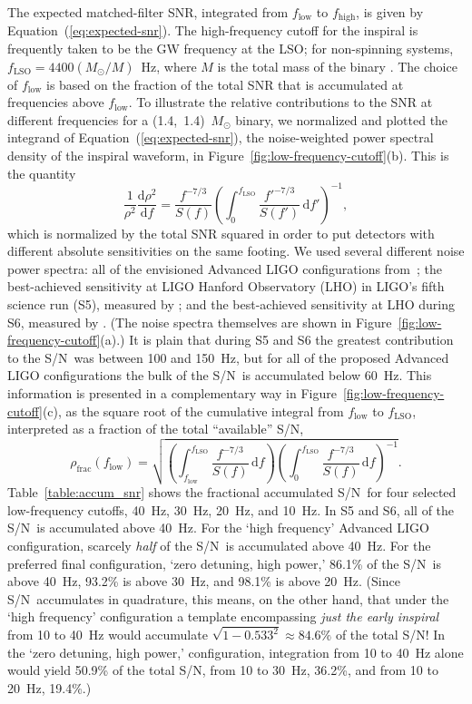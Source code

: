 \documentclass[preprint2]{aastex}
\newcommand{\SNR}{S/N}%
\newcommand{\Msun}{\ensuremath{M_{\odot}}}
\begin{document}
The expected matched-filter SNR, integrated from $f_\mathrm{low}$ to $f_\mathrm{high}$, is given by Equation~(\ref{eq:expected-snr}).  The high-frequency cutoff for the inspiral is frequently taken to be the GW frequency at the LSO; for non-spinning systems, $f_\mathrm{LSO} = 4400 (\Msun / M)$~Hz, where $M$ is the total mass of the binary \citep[section 3.4.1 of][]{livrev12}.  The choice of $f_\mathrm{low}$ is based on the fraction of the total SNR that is accumulated at frequencies above $f_\mathrm{low}$.  To illustrate the relative contributions to the SNR at different frequencies for a (1.4,~1.4)~$\Msun$ binary, we normalized and plotted the integrand of Equation~(\ref{eq:expected-snr}), the noise-weighted power spectral density of the inspiral waveform, in Figure~\ref{fig:low-frequency-cutoff}(b).  This is the quantity
%
$$
	\frac{1}{\rho^2}\frac{\mathrm{d}\rho^2}{\mathrm{d}f} = \frac{f^{-7/3}}{S(f)} \left( \int_0^{f_\mathrm{LSO}} \frac{{f'}^{-7/3}}{S(f')} \, \mathrm{d}f' \right)^{-1},
$$
%
which is normalized by the total SNR squared in order to put detectors with different absolute sensitivities on the same footing.  We used several different noise power spectra: all of the envisioned Advanced LIGO configurations from~\citet{ALIGONoise}; the best-achieved sensitivity at LIGO Hanford Observatory (LHO) in LIGO's fifth science run (S5), measured by \citet{S5InspiralRange}; and the best-achieved sensitivity at LHO during S6, measured by \citet{S6InspiralRange}.  (The noise spectra themselves are shown in Figure~\ref{fig:low-frequency-cutoff}(a).)  It is plain that during S5 and S6 the greatest contribution to the \SNR\ was between 100 and 150~Hz, but for all of the proposed Advanced LIGO configurations the bulk of the \SNR\ is accumulated below 60~Hz.  This information is presented in a complementary way in Figure~\ref{fig:low-frequency-cutoff}(c), as the square root of the cumulative integral from $f_\mathrm{low}$ to $f_\mathrm{LSO}$, interpreted as a fraction of the total ``available'' \SNR,
%
$$
	\rho_\mathrm{frac}(f_\mathrm{low}) = \sqrt{\left( \int_{f_\mathrm{low}}^{f_\mathrm{LSO}} \frac{{f}^{-7/3}}{S(f)} \, \mathrm{d}f \right) \left( \int_0^{f_\mathrm{LSO}} \frac{{f}^{-7/3}}{S(f)} \, \mathrm{d}f \right)^{-1}}.
$$
%
Table~\ref{table:accum_snr} shows the fractional accumulated \SNR\ for four selected low-frequency cutoffs, 40~Hz, 30~Hz, 20~Hz, and 10~Hz.  In S5 and S6, all of the \SNR\ is accumulated above 40~Hz.  For the `high frequency' Advanced LIGO configuration, scarcely \emph{half} of the \SNR\ is accumulated above 40~Hz.  For the preferred final configuration, `zero detuning, high power,' 86.1\% of the \SNR\ is above 40~Hz, 93.2\% is above 30~Hz, and 98.1\% is above 20~Hz.  (Since \SNR\ accumulates in quadrature, this means, on the other hand, that under the `high frequency' configuration a template encompassing \emph{just the early inspiral} from 10 to 40~Hz would accumulate $\sqrt{1 - 0.533^2} \approx 84.6\%$ of the total \SNR!  In the `zero detuning, high power,' configuration, integration from 10 to 40~Hz alone would yield 50.9\% of the total \SNR, from 10 to 30~Hz, 36.2\%, and from 10 to 20~Hz, 19.4\%.)
\end{document}
